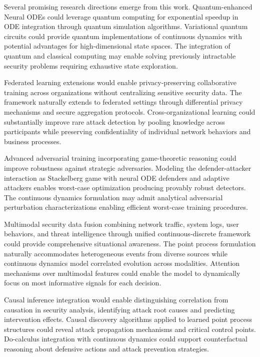 \documentclass[10pt,journal,compsoc]{IEEEtran}
\begin{document}
Several promising research directions emerge from this work. Quantum-enhanced Neural ODEs could leverage quantum computing for exponential speedup in ODE integration through quantum simulation algorithms. Variational quantum circuits could provide quantum implementations of continuous dynamics with potential advantages for high-dimensional state spaces. The integration of quantum and classical computing may enable solving previously intractable security problems requiring exhaustive state exploration.

Federated learning extensions would enable privacy-preserving collaborative training across organizations without centralizing sensitive security data. The framework naturally extends to federated settings through differential privacy mechanisms and secure aggregation protocols. Cross-organizational learning could substantially improve rare attack detection by pooling knowledge across participants while preserving confidentiality of individual network behaviors and business processes.

Advanced adversarial training incorporating game-theoretic reasoning could improve robustness against strategic adversaries. Modeling the defender-attacker interaction as Stackelberg game with neural ODE defenders and adaptive attackers enables worst-case optimization producing provably robust detectors. The continuous dynamics formulation may admit analytical adversarial perturbation characterizations enabling efficient worst-case training procedures.

Multimodal security data fusion combining network traffic, system logs, user behaviors, and threat intelligence through unified continuous-discrete framework could provide comprehensive situational awareness. The point process formulation naturally accommodates heterogeneous events from diverse sources while continuous dynamics model correlated evolution across modalities. Attention mechanisms over multimodal features could enable the model to dynamically focus on most informative signals for each decision.

Causal inference integration would enable distinguishing correlation from causation in security analysis, identifying attack root causes and predicting intervention effects. Causal discovery algorithms applied to learned point process structures could reveal attack propagation mechanisms and critical control points. Do-calculus integration with continuous dynamics could support counterfactual reasoning about defensive actions and attack prevention strategies.
\end{document}
